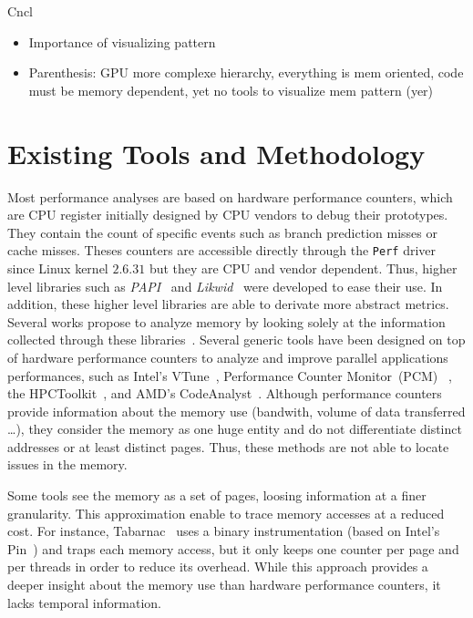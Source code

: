 Cncl
\begin{itemize}
    \item Importance of visualizing pattern
    \item Parenthesis: \gls{GPU} more complexe hierarchy, everything is mem oriented, code must be memory dependent, yet no tools to visualize mem pattern (yer)
\end{itemize}

\section{Existing Tools and Methodology}
\label{sec:mem-tools}

Most performance analyses are based on hardware performance counters, which are CPU
register initially designed by CPU vendors to debug their prototypes. They contain
the count of specific events such as branch prediction misses or cache misses.
Theses counters are accessible directly  through the \texttt{Perf} driver
since Linux kernel $2.6.31$ but they are CPU and vendor dependent. Thus, higher
level libraries such as \emph{PAPI}~\cite{Weaver13PAPI} and
\emph{Likwid}~\cite{Treibig10LIKWID} were developed to ease their use.
In addition, these higher level libraries are able to derivate more abstract metrics. Several works propose to analyze memory 
by looking solely at the information collected through these
libraries~\cite{Majo13(Mis)understanding,
Jiang14Understanding,Bosch00Rivet,Weyers14Visualization,Tao01Visualizing,DeRose01Hardware}.
%
Several generic tools have been designed on top of hardware performance counters
to analyze and improve parallel applications performances, such as Intel's
VTune~\cite{Reinders05VTune}, Performance Counter
Monitor~(PCM)~%
, the HPCToolkit~\cite{Adhianto10HPCTOOLKIT},
and AMD's CodeAnalyst~\cite{Drongowski08introduction}.
%
Although performance counters provide information about the memory use
(bandwith, volume of data transferred \ldots),  they consider the memory as
one huge entity and do not differentiate distinct addresses or at least
distinct pages. Thus, these methods are not able to locate issues in the memory.

Some tools see the memory as a set of pages, loosing information at a finer
granularity. This approximation enable to trace memory accesses at a reduced
cost. For instance, \gls{Tabarnac}~\cite{Beniamine15TABARNAC} uses a binary
instrumentation (based on Intel's Pin~\cite{Luk05Pin}) and traps each
memory access, but it only keeps one counter per page and per threads in order to
reduce its overhead. While this approach provides a deeper insight about the
memory use than hardware performance counters, it lacks temporal information.

